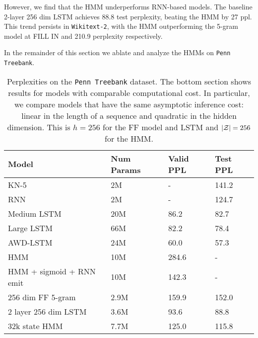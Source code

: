 \documentclass[11pt,a4paper]{article}
\begin{document}
However, we find that the HMM underperforms RNN-based models.
The baseline 2-layer 256 dim LSTM achieves 88.8 test perplexity,
beating the HMM by 27 ppl.
This trend persists in \texttt{Wikitext-2},
with the HMM outperforming the 5-gram model at {\color{red}FILL IN}
and 210.9 perplexity respectively.

\begin{comment}
Since the HMMs require parameters linear in the number of hidden states,
we find that the performance of the HMMs scales poorly compared to the other models
which only require parameters that scale linearly with the vocbaulary size.
Although representing and summing over the hidden states
allows us to explicitly capture uncertainty in the hidden state,
it proves to be a limiting factor in terms of performance.
\end{comment}

In the remainder of this section we ablate and analyze the HMMs on \texttt{Penn Treebank}.


\begin{table*}[!t]
\centering
\begin{tabular}{llll}
\toprule
Model & Num Params & Valid PPL & Test PPL\\
\midrule
KN-5 \citep{mikolov2012rnn}  & 2M & - & 141.2\\
RNN \citep{mikolov2012rnn}  & 2M & - & 124.7\\
Medium LSTM \citep{zaremba2014lstm} & 20M & 86.2 & 82.7\\
Large LSTM \citep{zaremba2014lstm} & 66M & 82.2 & 78.4\\
AWD-LSTM \citep{merity2017awdlstm} & 24M & 60.0 & 57.3\\
HMM \citep{buys2018hmm} & 10M & 284.6 & -\\
HMM + sigmoid + RNN emit \citep{buys2018hmm} & 10M & 142.3 & -\\
\midrule
256 dim FF 5-gram  & 2.9M     & 159.9      & 152.0  \\
2 layer 256 dim LSTM  & 3.6M     & 93.6       & 88.8   \\
32k state HMM   & 7.7M     & 125.0      & 115.8  \\
\bottomrule
\end{tabular}
\caption{\label{tbl:ptb-ppl}
Perplexities on the \texttt{Penn Treebank} dataset.
The bottom section shows results for models 
with comparable computational cost.
In particular, we compare models that have the same 
asymptotic inference cost: linear in
the length of a sequence and quadratic in the hidden
dimension.
This is $h=256$ for the FF model and LSTM
and $|\mathcal{Z}| = 256$ for the HMM.
}
\end{table*}
\end{document}
